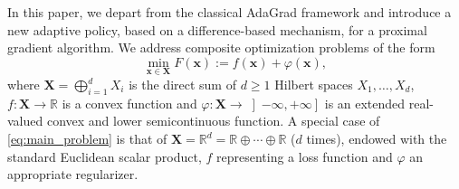 \documentclass[11pt]{article}
\theoremstyle{plain}
\theoremstyle{definition}
\theoremstyle{remark}
\newcommand{\matia}[2][]{\todo[color=red!20,#1]{{\bf MB:} #2}}
\newcommand{\scalarp}[1]{\langle{#1}\rangle}
\newcommand{\HH}{X}
\newcommand{\bHH}{\bm{X}}
\newcommand{\R}{\mathbb{R}}
\newcommand{\x}{x}
\newcommand{\m}{d}
\newcommand{\bx}{\bm{x}}
\newcommand{\RX}{\left]-\infty, +\infty\right]}
\newcommand{\reg}{\varphi}
\begin{document}
\noindent
In this paper, we depart from the classical AdaGrad framework and introduce
a new adaptive policy, based on a difference-based mechanism, for a proximal gradient algorithm. We address 
composite optimization problems of the form
\begin{equation}
    \min_{\bx\in \bHH}  F(\bx) := f(\bx) + \reg(\bx), 
\label{eq:main_problem}
\end{equation}
where $\bHH = \bigoplus_{i=1}^\m\HH_i$ is the direct sum of $\m\geq 1$ Hilbert spaces
$\HH_1, \dots, \HH_\m$, $f\colon \bHH\to \R$ is a convex function
and $\reg\colon \bHH\to \RX$ is an extended real-valued convex and lower semicontinuous function.
A special case of \eqref{eq:main_problem} is that of $\bHH= \R^\m = \R\oplus \cdots \oplus \R$ ($\m$ times), endowed with the standard Euclidean scalar product, $f$ representing a loss function and $\reg$ an appropriate regularizer.
\end{document}
